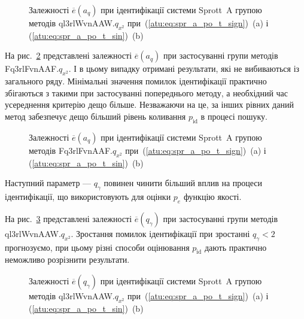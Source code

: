 \begin{figure}[htb!]
  \caption{Залежності $\overline{e}(a_q)$ при ідентифікації системи Sprott~A групою методів ql3rlWvnAAW.$q_{x^2}$ при~(\ref{atu:eq:spr_a_po_t_sign})~(a) і (\ref{atu:eq:spr_a_po_t_sin})~(b)}
  \label{atu:f:spr_a_a_q_ql3rlWvnAAW_q_x2}
\end{figure}


На рис.~\ref{atu:f:spr_a_a_q_Fq3rlFvnAAF_q_x2} представлені залежності
$\overline{e} (a_q)$ при застосуванні групи методів Fq3rlFvnAAF.$q_{x^2}$.
І в цьому випадку отримані результати, які не
вибиваються із загального ряду. Мінімальні значення помилок
ідентифікації практично збігаються з такими при застосуванні
попереднього методу, а необхідний час усереднення критерію
дещо більше. Незважаючи на це, за інших рівних даний метод
забезпечує дещо більший рівень коливання
$p_\mathrm{id}$ в процесі пошуку.


\begin{figure}[htb!]
  \caption{Залежності $\overline{e}(a_q)$ при ідентифікації системи Sprott~A групою методів Fq3rlFvnAAF.$q_{x^2}$ при~(\ref{atu:eq:spr_a_po_t_sign})~(a) і (\ref{atu:eq:spr_a_po_t_sin})~(b)}
  \label{atu:f:spr_a_a_q_Fq3rlFvnAAF_q_x2}
\end{figure}

Наступний параметр ---
$q_\gamma$ повинен чинити більший вплив на процеси ідентифікації,
що використовують для оцінки
$p_e$ функцію якості.

На рис.~\ref{atu:f:spr_a_ql3rlWvnAAW_q_x2} представлені залежності
$\overline{e} (q_\gamma)$ при застосуванні групи методів ql3rlWvnAAW.$q_{x^2}$.
Зростання помилок ідентифікації при зростанні
$q_\gamma <2$ прогнозуємо, при цьому різні способи оцінювання
$p_\mathrm{id}$ дають практично неможливо розрізнити результати.

\begin{figure}[htb!]
  \caption{Залежності $\overline{e} (q_\gamma)$ при ідентифікації системи Sprott~A групою методів ql3rlWvnAAW.$q_{x^2}$ при~(\ref{atu:eq:spr_a_po_t_sign})~(a) і (\ref{atu:eq:spr_a_po_t_sin})~(b)}
  \label{atu:f:spr_a_ql3rlWvnAAW_q_x2}
\end{figure}

